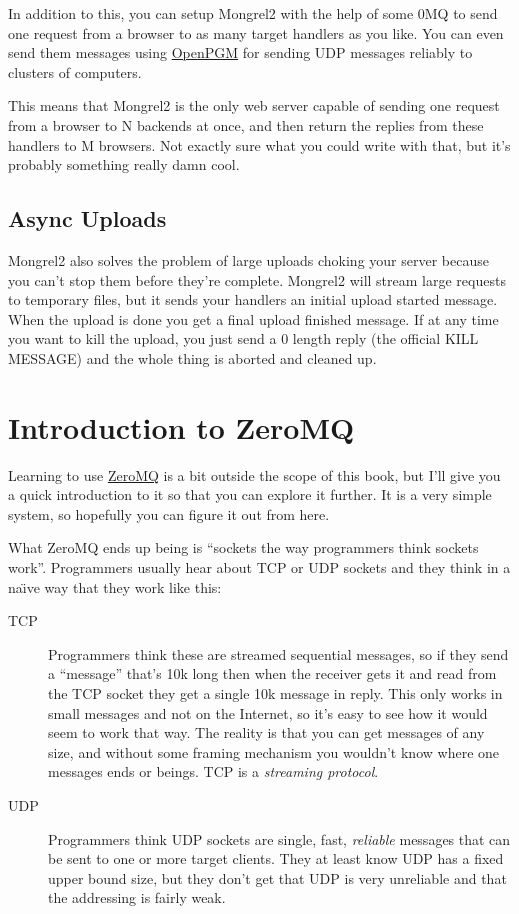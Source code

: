 In addition to this, you can setup Mongrel2 with the help of some 0MQ to send
one request from a browser to as many target handlers as you like.  You can
even send them messages using \href{http://code.google.com/p/openpgm/}{OpenPGM}
for sending UDP messages reliably to clusters of computers.

This means that Mongrel2 is the only web server capable of sending one request
from a browser to N backends at once, and then return the replies from these
handlers to M browsers.  Not exactly sure what you could write with that, but
it's probably something really damn cool.

\subsection{Async Uploads}

Mongrel2 also solves the problem of large uploads choking your server
because you can't stop them before they're complete.  Mongrel2 will stream
large requests to temporary files, but it sends your handlers an initial
upload started message.  When the upload is done you get a final upload 
finished message.  If at any time you want to kill the upload, you just
send a 0 length reply (the official KILL MESSAGE) and the whole thing is
aborted and cleaned up.


\section{Introduction to ZeroMQ}

Learning to use \href{http://zeromq.org}{ZeroMQ} is a bit outside the scope of this book, but I'll give you
a quick introduction to it so that you can explore it further.  It is a very simple
system, so hopefully you can figure it out from here.

What ZeroMQ ends up being is ``sockets the way programmers think sockets work''.  Programmers
usually hear about TCP or UDP sockets and they think in a na{\"\i}ve way that they work like
this:

\begin{description}
\item [TCP] Programmers think these are streamed sequential messages, so if
   they send a ``message'' that's 10k long then when the receiver gets it and read
   from the TCP socket they get a single 10k message in reply.  This only works in
   small messages and not on the Internet, so it's easy to see how it would seem
   to work that way.  The reality is that you can get messages of any size, and without
   some framing mechanism you wouldn't know where one messages ends or beings.
   TCP is a \emph{streaming protocol}.

\item [UDP] Programmers think UDP sockets are single, fast, \emph{reliable} messages
    that can be sent to one or more target clients.  They at least know UDP has a fixed
    upper bound size, but they don't get that UDP is very unreliable and that the addressing
    is fairly weak.
\end{description}

